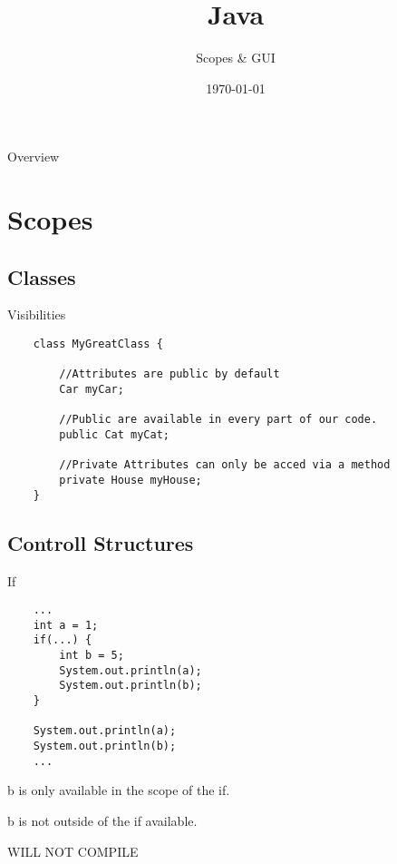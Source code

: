 


\title{Java}
\subtitle{Scopes \& GUI}
\date{\today}



\begin{frame}
\titlepage
\end{frame}

\begin{frame}{Overview}
\tableofcontents
\end{frame}

\section{Scopes}
\subsection{Classes}

\begin{frame}[fragile]{Visibilities}
    \begin{lstlisting}
    class MyGreatClass {
    
        //Attributes are public by default
        Car myCar; 
    
        //Public are available in every part of our code.
        public Cat myCat;
        
        //Private Attributes can only be acced via a method
        private House myHouse;
    }\end{lstlisting}
\end{frame}

\subsection{Controll Structures}
\begin{frame}[fragile]{If}
    \begin{lstlisting}
    ...
    int a = 1;
    if(...) {
        int b = 5;
        System.out.println(a);
        System.out.println(b);
    }
    
    System.out.println(a);
    System.out.println(b);
    ...\end{lstlisting}
    
    b is only available in the scope of the if.
    
    b is not outside of the if available.
    
    \color{red} WILL NOT COMPILE
\end{frame}

